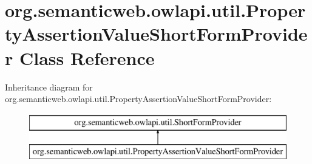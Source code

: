 \hypertarget{classorg_1_1semanticweb_1_1owlapi_1_1util_1_1_property_assertion_value_short_form_provider}{\section{org.\-semanticweb.\-owlapi.\-util.\-Property\-Assertion\-Value\-Short\-Form\-Provider Class Reference}
\label{classorg_1_1semanticweb_1_1owlapi_1_1util_1_1_property_assertion_value_short_form_provider}
}
Inheritance diagram for org.\-semanticweb.\-owlapi.\-util.\-Property\-Assertion\-Value\-Short\-Form\-Provider\-:\begin{figure}[H]
\begin{center}
\leavevmode
\includegraphics[height=2.000000cm]{classorg_1_1semanticweb_1_1owlapi_1_1util_1_1_property_assertion_value_short_form_provider}
\end{center}
\end{figure}
